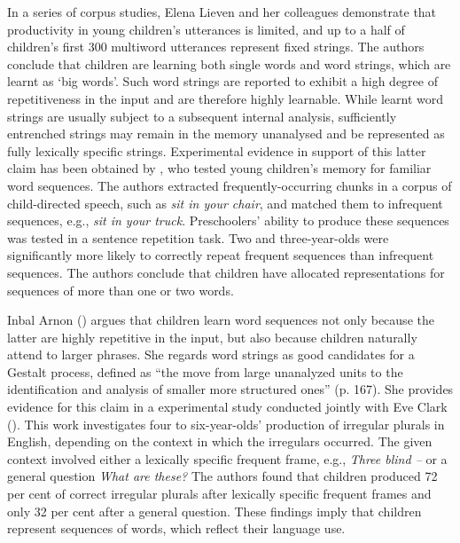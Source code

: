In a series of corpus studies, Elena Lieven and her colleagues \citep{lieven-pine-baldwin-1997,dabrowska-lieven-2005,lieven-salomo-tomasello-2009} demonstrate that productivity in young children's utterances is limited, and up to a half of children's first 300 multiword utterances represent fixed strings. The authors conclude that children are learning both single words and word strings, which are learnt as `big words'. Such word strings are reported to exhibit a high degree of repetitiveness in the input and are therefore highly learnable. While learnt word strings are usually subject to a subsequent internal analysis, sufficiently entrenched strings may remain in the memory unanalysed and be represented as fully lexically specific strings. Experimental evidence in support of this latter claim has been obtained by \citet{bannard-matthews-2008}, who tested young children's memory for familiar word sequences. The authors extracted frequently-occurring chunks in a corpus of child-directed speech, such as \textit{sit in your chair}, and matched them to infrequent sequences, e.g., \textit{sit in your truck}. Preschoolers' ability to produce these sequences was tested in a sentence repetition task. Two and three-year-olds were significantly more likely to correctly repeat frequent sequences than infrequent sequences. The authors conclude that children have allocated representations for sequences of more than one or two words. 

Inbal Arnon (\citeyear{arnon-2011}) argues that children learn word sequences not only because the latter are highly repetitive in the input, but also because children naturally attend to larger phrases. She regards word strings as good candidates for a Gestalt process, defined as ``the move from large unanalyzed units to the identification and analysis of smaller more structured ones'' (p. 167). She provides evidence for this claim in a experimental study conducted jointly with Eve Clark (\citeyear{arnon-clark-2011}). This work investigates four to six-year-olds' production of irregular plurals in English, depending on the context in which the irregulars occurred. The given context involved either a lexically specific frequent frame, e.g., \textit{Three blind  -- } or a general question \textit{What are these?} The authors found that children produced 72 per cent of correct irregular plurals after lexically specific frequent frames and only 32 per cent after a general question. These findings imply that children represent sequences of words, which reflect their language use.

